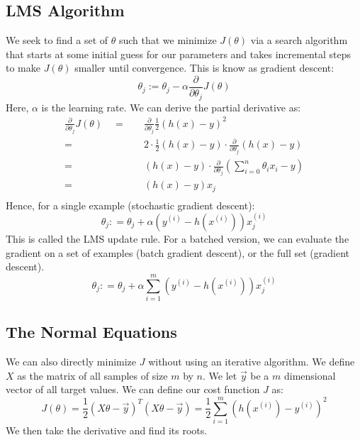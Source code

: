 \documentclass[twoside,twocolumn]{article}
\begin{document}
\subsection{LMS Algorithm}
We seek to find a set of $\theta$ such that we minimize $J(\theta)$ via a
search algorithm that starts at some initial guess for our parameters and takes
incremental steps to make $J(\theta)$ smaller until convergence. This is know
as gradient descent:
\begin{equation}
  \theta_j := \theta_j - \alpha \frac{\partial}{\partial \theta_j}J(\theta)
\end{equation}
Here, $\alpha$ is the learning rate. We can derive the partial derivative as:
\begin{equation}
  \begin{split}
    \frac{\partial}{\partial \theta_{j}}J(\theta) \quad =& \quad \frac{\partial}{\partial \theta_{j}}\frac{1}{2} \left( h(x)-y \right)^{2} \\
    =& \quad 2\cdot \frac{1}{2} \left(h(x) - y \right) \cdot \frac{\partial}{\partial \theta_{j}} (h(x) - y) \\
    =& \quad \left(h(x) - y \right) \cdot \frac{\partial}{\partial \theta_{j}} \left(\sum_{i=0}^{n} \theta_{i} x_{i} - y \right) \\
    =& \quad \left( h ( x ) - y \right) x _ { j } \\
\end{split}
\end{equation}
Hence, for a single example (stochastic gradient descent):
\begin{equation}
  \theta _ { j } : = \theta _ { j } + \alpha \left( y ^ { ( i ) } - h \left( x ^ { ( i ) } \right) \right) x _ { j } ^ { ( i ) }
\end{equation}
This is called the LMS update rule. For a batched version, we can evaluate the
gradient on a set of examples (batch gradient descent), or the full set
(gradient descent).
\begin{equation}
  \theta _ { j } : = \theta _ { j } + \alpha \sum _ { i = 1 } ^ { m } \left( y ^ { ( i ) } - h \left( x ^ { ( i ) } \right) \right) x _ { j } ^ { ( i ) }
\end{equation}
\subsection{The Normal Equations}
We can also directly minimize $J$ without using an iterative algorithm. We
define $X$ as the matrix of all samples of size $m$ by $n$.
We let $\vec{y}$ be a $m$ dimensional vector of all target values. We can
define our cost function $J$ as:
\begin{equation}
  J(\theta) = \frac { 1 } { 2 } ( X \theta - \vec { y } ) ^ { T } ( X \theta - \vec { y } ) = \frac { 1 } { 2 } \sum _ { i = 1 } ^ { m } \left( h \left( x ^ { ( i ) } \right) - y ^ { ( i ) } \right) ^ { 2 }
\end{equation}
We then take the derivative and find its roots.
\end{document}
